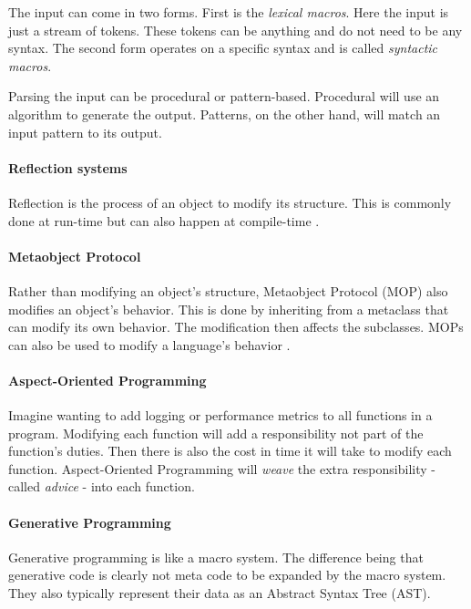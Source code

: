 The input can come in two forms.
First is the \textit{lexical macros}.
Here the input is just a stream of tokens.
These tokens can be anything and do not need to be any syntax.
The second form operates on a specific syntax and is called \textit{syntactic macros}.

Parsing the input can be procedural or pattern-based.
Procedural will use an algorithm to generate the output.
Patterns, on the other hand, will match an input pattern to its output.

\paragraph{Reflection systems}
Reflection is the process of an object to modify its structure.
This is commonly done at run-time but can also happen at compile-time \cite{savidis_19_01}.

\paragraph{Metaobject Protocol}
Rather than modifying an object's structure, Metaobject Protocol (MOP) also modifies an object's behavior.
This is done by inheriting from a metaclass that can modify its own behavior.
The modification then affects the subclasses. \cite{lee_95_01, savidis_19_01}
MOPs can also be used to modify a language's behavior \cite{seaton_15_01}.

\paragraph{Aspect-Oriented Programming}
Imagine wanting to add logging or performance metrics to all functions in a program.
Modifying each function will add a responsibility not part of the function's duties.
Then there is also the cost in time it will take to modify each function.
Aspect-Oriented Programming will \textit{weave} the extra responsibility - called \textit{advice} - into each function. \cite{savidis_19_01}

\paragraph{Generative Programming}
Generative programming is like a macro system.
The difference being that generative code is clearly not meta code to be expanded by the macro system.
They also typically represent their data as an Abstract Syntax Tree (AST). \cite{savidis_19_01}

